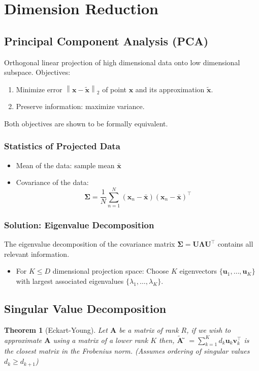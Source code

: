 \documentclass[11pt,a4paper,technote]{IEEEtran}
\newtheorem*{thm}{Theorem}
\newcommand{\norm}[1]{\left\lVert#1\right\rVert}
\newcommand{\matr}[1]{\boldsymbol{\mathbf{#1}}}
\newcommand{\vect}[1]{\boldsymbol{\mathbf{#1}}}
\newcommand{\trns}[1]{#1^{\top}}
\begin{document}
\section*{Dimension Reduction}
\subsection*{Principal Component Analysis (PCA)}
Orthogonal linear projection of high dimensional data onto low
dimensional subspace. Objectives:
\begin{enumerate}
  \item Minimize error $\norm{\vect{x} - \tilde{\vect{x}}}_2$ of
    point $\vect{x}$ and its approximation $\tilde{\vect{x}}$.
  \item Preserve information: maximize variance.
\end{enumerate}
Both objectives are shown to be formally equivalent.
\subsubsection*{Statistics of Projected Data}
\begin{itemize}
  \item Mean of the data: sample mean $\bar{\vect{x}}$
  \item Covariance of the data:
    \[
      \matr{\Sigma} = \frac{1}{N} \sum_{n=1}^N (\vect{x}_n -
      \bar{\vect{x}}) \trns{(\vect{x}_n - \bar{\vect{x}})}
    \]
\end{itemize}
\subsubsection*{Solution: Eigenvalue Decomposition}
The eigenvalue decomposition of the covariance matrix
$\matr{\Sigma} = \matr{U}\matr{\Lambda}\trns{\matr{U}}$ contains
all relevant information.
\begin{itemize}
  \item For $K \leq D$ dimensional projection space: Choose $K$
    eigenvectors $\{\vect{u}_1, \ldots, \vect{u}_K\}$ with largest
    associated eigenvalues $\{\lambda_1, \ldots, \lambda_K\}$.
\end{itemize}

\subsection*{Singular Value Decomposition}
\begin{thm}[Eckart-Young]
  Let $\matr{A}$ be a matrix of rank $R$, if we wish to
  approximate $\matr{A}$ using a matrix of a lower rank $K$
  then, $\tilde{\matr{A}} ̃= \sum_{k=1}^K d_k \vect{u}_k
  \trns{\vect{v}_k}$ is the closest matrix in the Frobenius norm.
  (Assumes ordering of singular values $d_k \geq d_{k+1}$)
\end{thm}
\end{document}
